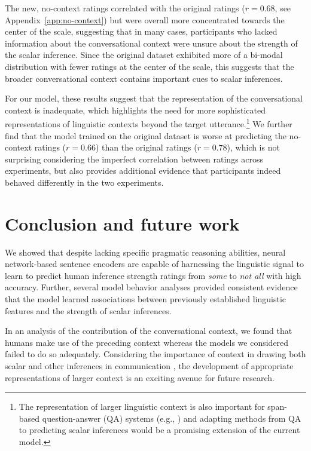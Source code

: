 \documentclass[11pt,a4paper]{article}
\begin{document}
The new, no-context ratings correlated with the original ratings ($r=0.68$, see Appendix~\ref{app:no-context}) but were overall more concentrated towards the center of the scale, suggesting that in many cases, participants who lacked information about the conversational context were unsure about the strength of the scalar inference. Since the original dataset exhibited more of a bi-modal distribution with fewer ratings at the center of the scale, this suggests that the broader conversational context contains important cues to scalar inferences.



For our model, these results suggest that the representation of the conversational context is inadequate, which highlights the need for more sophisticated representations of linguistic contexts beyond the target utterance.\footnote{The representation of larger linguistic context is also important for span-based question-answer (QA) systems (e.g., \citealp{hermann2015,chen2018,devlin2019bert}) and adapting methods from QA to predicting scalar inferences would be a promising extension of the current model.} We further find that the model trained on the original dataset is worse at predicting the no-context ratings ($r=0.66$) than the original ratings ($r=0.78$), which is not surprising considering the imperfect correlation between ratings across experiments, but also provides additional evidence that participants indeed behaved differently in the two experiments. 

\section{Conclusion and future work}

We showed that despite lacking specific pragmatic reasoning abilities, neural network-based sentence encoders are capable of harnessing the linguistic signal to learn to predict human inference strength ratings from \emph{some} to \emph{not all} with high accuracy. Further, several model behavior analyses provided consistent evidence that the model learned associations between previously established linguistic features and the strength of scalar inferences. 

In an analysis of the contribution of the conversational context, we found that humans make use of the preceding context whereas the models we considered failed to do so adequately. Considering the importance of context in drawing both scalar and other inferences in communication \cite{Grice1975,clark1992arenas,bonnefon2009some,Zondervan2010,bergengrodner2012,goodman2013knowledge,degen2015wonky}, the development of  appropriate representations of larger context is an exciting avenue for future research. 
\end{document}
